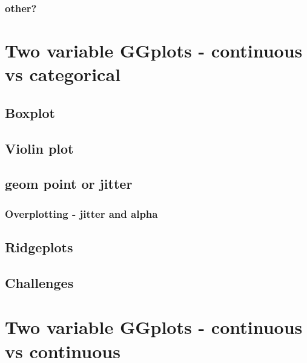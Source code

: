 \documentclass[
]{book}
\begin{document}
\hypertarget{other}{%
\subsection{other?}\label{other}}

\hypertarget{two-variable-ggplots---continuous-vs-categorical}{%
\chapter{Two variable GGplots - continuous vs categorical}\label{two-variable-ggplots---continuous-vs-categorical}}

\hypertarget{boxplot}{%
\section{Boxplot}\label{boxplot}}

\hypertarget{violin-plot}{%
\section{Violin plot}\label{violin-plot}}

\hypertarget{geom-point-or-jitter}{%
\section{geom point or jitter}\label{geom-point-or-jitter}}

\hypertarget{overplotting---jitter-and-alpha}{%
\subsection{Overplotting - jitter and alpha}\label{overplotting---jitter-and-alpha}}

\hypertarget{ridgeplots}{%
\section{Ridgeplots}\label{ridgeplots}}

\hypertarget{challenges}{%
\section{Challenges}\label{challenges}}

\hypertarget{two-variable-ggplots---continuous-vs-continuous}{%
\chapter{Two variable GGplots - continuous vs continuous}\label{two-variable-ggplots---continuous-vs-continuous}}
\end{document}
